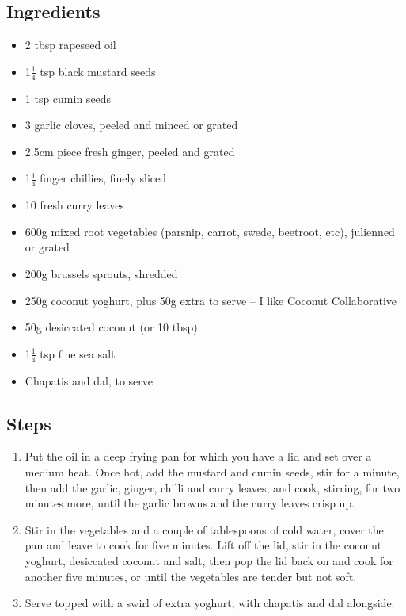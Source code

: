 \documentclass{book}
\begin{document}
\subsection*{Ingredients}
\begin{itemize}
\item 2 tbsp rapeseed oil
\item 1$\frac{1}{4}$ tsp black mustard seeds
\item 1 tsp cumin seeds
\item 3 garlic cloves, peeled and minced or grated
\item 2.5cm piece fresh ginger, peeled and grated
\item 1$\frac{1}{4}$ finger chillies, finely sliced
\item 10 fresh curry leaves
\item 600g mixed root vegetables (parsnip, carrot, swede, beetroot, etc), julienned or grated
\item 200g brussels sprouts, shredded
\item 250g coconut yoghurt, plus 50g extra to serve – I like Coconut Collaborative
\item 50g desiccated coconut (or 10 tbsp) 
\item 1$\frac{1}{4}$ tsp fine sea salt
\item Chapatis and dal, to serve
\end{itemize}

\subsection*{Steps}
\begin{enumerate}
\item Put the oil in a deep frying pan for which you have a lid and set over a medium heat. Once hot, add the mustard and cumin seeds, stir for a minute, then add the garlic, ginger, chilli and curry leaves, and cook, stirring, for two minutes more, until the garlic browns and the curry leaves crisp up.
\item Stir in the vegetables and a couple of tablespoons of cold water, cover the pan and leave to cook for five minutes. Lift off the lid, stir in the coconut yoghurt, desiccated coconut and salt, then pop the lid back on and cook for another five minutes, or until the vegetables are tender but not soft.
\item Serve topped with a swirl of extra yoghurt, with chapatis and dal alongside.
\end{enumerate}
\newpage
\end{document}
